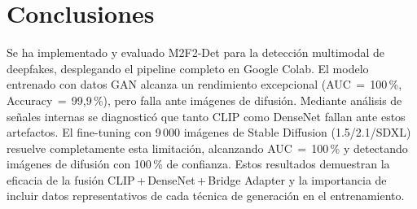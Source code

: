 \documentclass[pdflatex,sn-mathphys-num]{sn-jnl}
\begin{document}
\section{Conclusiones}\label{sec:conclusion}

Se ha implementado y evaluado M2F2-Det para la detección multimodal de deepfakes, desplegando el pipeline completo en Google Colab. El modelo entrenado con datos GAN alcanza un rendimiento excepcional (AUC$\,=\,$100\,\%, Accuracy$\,=\,$99,9\,\%), pero falla ante imágenes de difusión. Mediante análisis de señales internas se diagnosticó que tanto CLIP como DenseNet fallan ante estos artefactos. El fine-tuning con 9\,000 imágenes de Stable Diffusion (1.5/2.1/SDXL) resuelve completamente esta limitación, alcanzando AUC$\,=\,$100\,\% y detectando imágenes de difusión con 100\,\% de confianza. Estos resultados demuestran la eficacia de la fusión CLIP\,+\,DenseNet\,+\,Bridge Adapter y la importancia de incluir datos representativos de cada técnica de generación en el entrenamiento.


\backmatter
\end{document}
